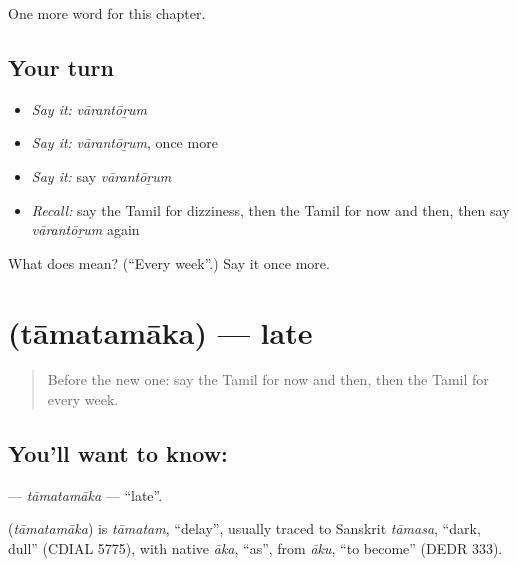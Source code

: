 \begin{grammarlens}[title={What you've built}]
One more word for this chapter.
\end{grammarlens}

\subsection*{Your turn}
\begin{itemize}
\raggedright
  \item \emph{Say it:} \emph{vārantōṟum}
  \item \emph{Say it:} \emph{vārantōṟum}, once more
  \item \emph{Say it:} say \emph{vārantōṟum}
  \item \emph{Recall:} say the Tamil for dizziness, then the Tamil for now and then, then say \emph{vārantōṟum} again
\end{itemize}

\begin{tcolorbox}[breakable,colback=teal!4,colframe=teal!35!black,title={Before you move on}]
What does  mean? (\textquotedblleft{}Every week\textquotedblright{}.) Say it once more.
\end{tcolorbox}
\section[\texorpdfstring{\ta{தாமதமாக} (tāmatamāka)}{தாமதமாக (tāmatamāka)}]{ (tāmatamāka) — late}

\label{lesson:TA-C262-tamatamaka}



\begin{quote}
Before the new one: say the Tamil for now and then, then the Tamil for every week.
\end{quote}

\subsection*{You'll want to know: }
\textbf{} — \emph{tāmatamāka} — \textquotedblleft{}late\textquotedblright{}.

\begin{cousinweb}
\textbf{} (\emph{tāmatamāka}) is \emph{tāmatam}, \textquotedblleft{}delay\textquotedblright{}, usually traced to Sanskrit \emph{tāmasa}, \textquotedblleft{}dark, dull\textquotedblright{} (CDIAL 5775), with native \emph{āka}, \textquotedblleft{}as\textquotedblright{}, from \emph{āku}, \textquotedblleft{}to become\textquotedblright{} (DEDR 333).
\end{cousinweb}

